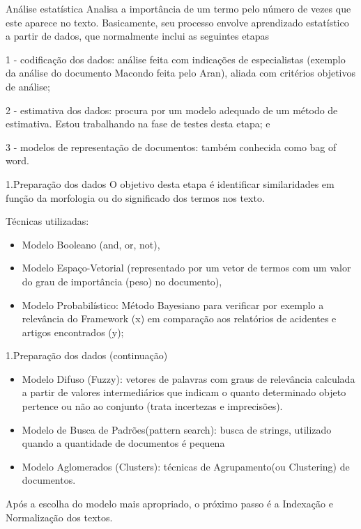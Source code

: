 \documentclass[
  ignorenonframetext,
]{beamer}
\begin{document}
\begin{frame}{Análise estatística}
\protect\hypertarget{anuxe1lise-estatuxedstica}{}
Analisa a importância de um termo pelo número de vezes que este aparece
no texto. Basicamente, seu processo envolve aprendizado estatístico a
partir de dados, que normalmente inclui as seguintes etapas

1 - codiﬁcação dos dados: análise feita com indicações de especialistas
(exemplo da análise do documento Macondo feita pelo Aran), aliada com
critérios objetivos de análise;

2 - estimativa dos dados: procura por um modelo adequado de um método de
estimativa. Estou trabalhando na fase de testes desta etapa; e

3 - modelos de representação de documentos: também conhecida como bag of
word.
\end{frame}

\begin{frame}{1.Preparação dos dados}
\protect\hypertarget{preparauxe7uxe3o-dos-dados}{}
O objetivo desta etapa é identiﬁcar similaridades em função da
morfologia ou do signiﬁcado dos termos nos texto.

Técnicas utilizadas:

\begin{itemize}[<+->]
\item
  Modelo Booleano (and, or, not),
\item
  Modelo Espaço-Vetorial (representado por um vetor de termos com um
  valor do grau de importância (peso) no documento),
\item
  Modelo Probabilístico: Método Bayesiano para verificar por exemplo a
  relevância do Framework (x) em comparação aos relatórios de acidentes
  e artigos encontrados (y);
\end{itemize}
\end{frame}

\begin{frame}{1.Preparação dos dados (continuação)}
\protect\hypertarget{preparauxe7uxe3o-dos-dados-continuauxe7uxe3o}{}
\begin{itemize}[<+->]
\item
  Modelo Difuso (Fuzzy): vetores de palavras com graus de relevância
  calculada a partir de valores intermediários que indicam o quanto
  determinado objeto pertence ou não ao conjunto (trata incertezas e
  imprecisões).
\item
  Modelo de Busca de Padrões(pattern search): busca de strings,
  utilizado quando a quantidade de documentos é pequena
\item
  Modelo Aglomerados (Clusters): técnicas de Agrupamento(ou Clustering)
  de documentos.
\end{itemize}

Após a escolha do modelo mais apropriado, o próximo passo é a Indexação
e Normalização dos textos.
\end{frame}
\end{document}
